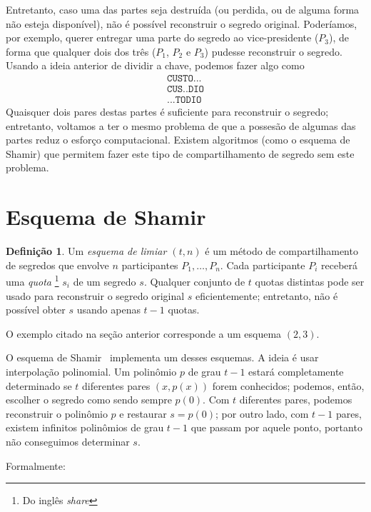 \documentclass[10pt,twocolumn]{article}
\theoremstyle{definition}
\newtheorem{definition}[theorem]{Definição}
\begin{document}
Entretanto,
caso uma das partes seja destruída
(ou perdida, ou de alguma forma não esteja disponível),
não é possível reconstruir o segredo original.
Poderíamos, por exemplo,
querer entregar uma parte do segredo ao vice-presidente ($P_3$),
de forma que qualquer dois dos três ($P_1$, $P_2$ e $P_3$)
pudesse reconstruir o segredo.
Usando a ideia anterior de dividir a chave,
podemos fazer algo como
\begin{align*}
    \texttt{CUSTO...} \\
    \texttt{CUS..DIO} \\
    \texttt{...TODIO}
\end{align*}
Quaisquer dois pares destas partes é suficiente para reconstruir o segredo;
entretanto,
voltamos a ter o mesmo problema de que a possesão de algumas das partes
reduz o esforço computacional.
Existem algoritmos
(como o esquema de Shamir)
que permitem fazer este tipo de compartilhamento de segredo
sem este problema.

\section{Esquema de Shamir}

\begin{definition}
    Um \emph{esquema de limiar $(t, n)$}
    é um método de compartilhamento de segredos
    que envolve $n$ participantes $P_1, \dots, P_n$.
    Cada participante $P_i$ receberá uma \emph{quota}%
    \footnote{Do inglês \emph{share}}
    $s_i$ de um segredo $s$.
    Qualquer conjunto de $t$ quotas distintas
    pode ser usado para reconstruir o segredo original $s$ eficientemente;
    entretanto,
    não é possível obter $s$ usando apenas $t-1$ quotas.
    \cite{Shamir1979}
\end{definition}

O exemplo citado na seção anterior corresponde a um esquema $(2, 3)$.

O esquema de Shamir~\cite{Shamir1979} implementa um desses esquemas.
A ideia é usar interpolação polinomial.
Um polinômio $p$ de grau $t-1$ estará completamente determinado
se $t$ diferentes pares $(x, p(x))$ forem conhecidos;
podemos, então,
escolher o segredo como sendo sempre $p(0)$.
Com $t$ diferentes pares,
podemos reconstruir o polinômio $p$ e restaurar $s = p(0)$;
por outro lado,
com $t-1$ pares,
existem infinitos polinômios de grau $t-1$ que passam por aquele ponto,
portanto não conseguimos determinar $s$.

Formalmente:
\end{document}
